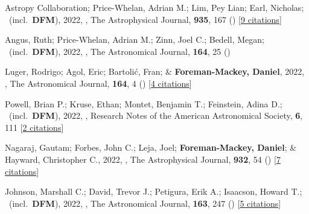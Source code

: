 \item[{\color{numcolor}\scriptsize85}] Astropy Collaboration; Price-Whelan, Adrian M.; Lim, Pey Lian; Earl, Nicholas; \etal\ (incl.\ \textbf{DFM}), 2022, , The Astrophysical Journal, \textbf{935}, 167 () [\href{https://ui.adsabs.harvard.edu/abs/2022ApJ...935..167A}{9 citations}]

\item[{\color{numcolor}\scriptsize84}] Angus, Ruth; Price-Whelan, Adrian M.; Zinn, Joel C.; Bedell, Megan; \etal\ (incl.\ \textbf{DFM}), 2022, , The Astronomical Journal, \textbf{164}, 25 ()

\item[{\color{numcolor}\scriptsize83}] Luger, Rodrigo; Agol, Eric; Bartoli{\'c}, Fran; \& \textbf{Foreman-Mackey, Daniel}, 2022, , The Astronomical Journal, \textbf{164}, 4 () [\href{https://ui.adsabs.harvard.edu/abs/2022AJ....164....4L}{4 citations}]

\item[{\color{numcolor}\scriptsize82}] Powell, Brian P.; Kruse, Ethan; Montet, Benjamin T.; Feinstein, Adina D.; \etal\ (incl.\ \textbf{DFM}), 2022, , Research Notes of the American Astronomical Society, \textbf{6}, 111 [\href{https://ui.adsabs.harvard.edu/abs/2022RNAAS...6..111P}{2 citations}]

\item[{\color{numcolor}\scriptsize81}] Nagaraj, Gautam; Forbes, John C.; Leja, Joel; \textbf{Foreman-Mackey, Daniel}; \& Hayward, Christopher C., 2022, , The Astrophysical Journal, \textbf{932}, 54 () [\href{https://ui.adsabs.harvard.edu/abs/2022ApJ...932...54N}{7 citations}]

\item[{\color{numcolor}\scriptsize80}] Johnson, Marshall C.; David, Trevor J.; Petigura, Erik A.; Isaacson, Howard T.; \etal\ (incl.\ \textbf{DFM}), 2022, , The Astronomical Journal, \textbf{163}, 247 () [\href{https://ui.adsabs.harvard.edu/abs/2022AJ....163..247J}{5 citations}]

